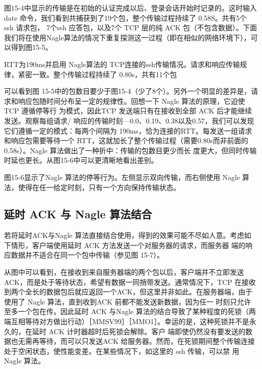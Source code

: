 图15-4中显示的传输是在初始的认证完成以后、登录会话开始时记录的。这时输入date 命令，我们看到共捕获到了19个包，整个传输过程持续了 0.58S。共有5个 ssh 请求包，
7个ssh 应答包，以及7个 TCP 层的纯 ACK 包（不包含数据）。下面我们将在使用Nagle算法的情况下重复探测这一过程（即在相似的网络环境下），可以得到图15-5。

RTT为190ms并启用 Nagle算法的 TCP连接的ssh传输情况。请求和响应传输规律，紧密一致。整个传输过程持续了 0.80s，共有11个包

可以看到图 15-5中的包数目要少于图15-4（少了8个）。另外一个明显的差异是，请求和响应包随时间分布呈一定的规律性。回想一下 Nagle 算法的原理，它迫使 TCP 遵循停等行
为模式，因此TCP 发送端只有在接收到全部 ACK 后才能继续发送。观察每组请求/ 响应的传输时刻—0.0、0.19、0.38以及0.57，我们可以发现它们遵循一定的模式：每两个间隔为
190ms，恰为连接的RTT。每发送一组请求和响应包需要等待一个 RTT，这就加长了整个传输过程（需要0.80s而非前面的0.58s）。Nagle 算法做出了一种折中：传输的包数目更少而长
度更大，但同时传输时延也更长。从图15-6中可以更清晰地看出差别。

图15-6显示了Nagle 算法的停等行为。左侧显示双向传输，而右侧使用 Nagle 算法，使得在任一给定时刻，只有一个方向保持传输状态。

\subsection{延时 ACK 与 Nagle 算法结合}
若将延时ACK与Nagle 算法直接结合使用，得到的效果可能不尽如人意。考虑如下情形，客户端使用延时 ACK 方法发送一个对服务器的请求，而服务器
端的响应数据并不适合在同一个包中传输（参见图 15-7）。

从图中可以看到，在接收到来自服务器端的两个包以后，客户端并不立即发送 ACK，而是处于等待状态，希望有数据一同捎带发送。通常情况下，TCP
在接收到两个全长的数据包后就应返回一个ACK，但这里并非如此。在服务器端，由于使用了 Nagle 算法，直到收到ACK 前都不能发送新数据，因为任一
时刻只允许至多一个包在传。因此延时
ACK 与Nagle 算法的结合导致了某种程度的死锁（两端互相等待对方做出行动）［MMSV99］［MMO1］。幸运的是，这种死锁并不是永久的，在延时 ACK 计时器超时后死锁会解除。客户
端即使仍然没有要发送的数据也无需再等待，而可以只发送ACK 给服务器。然而，在死锁期间整个传输连接处于空闲状态，使性能变差。在某些情况下，如这里的 ssh 传输，可以禁
用 Nagle 算法。

